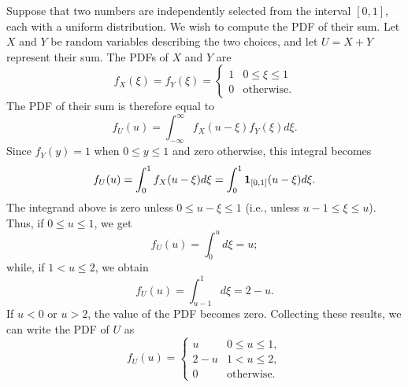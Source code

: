 \begin{example}
Suppose that two numbers are independently selected from the interval $[0,1]$, each with a uniform distribution.
We wish to compute the PDF of their sum.
Let $X$ and $Y$ be random variables describing the two choices, and let $U = X + Y$ represent their sum.
The PDFs of $X$ and $Y$ are
\begin{equation*}
f_X(\xi) = f_Y(\xi)
= \begin{cases} 1 & 0 \leq \xi \leq 1 \\
0 & \text{otherwise} . \end{cases}
\end{equation*}
The PDF of their sum is therefore equal to
\begin{equation*}
f_U(u) = \int_{-\infty}^{\infty} f_X(u - \xi) f_Y(\xi) d\xi .
\end{equation*}
Since $f_Y(y) = 1$ when $0 \leq y \leq 1$ and zero otherwise, this integral becomes
\begin{equation*}
f_U (u) = \int_0^1 f_X(u - \xi) d\xi
= \int_0^1 \mathbf{1}_{[0,1]}(u - \xi) d\xi .
\end{equation*}
The integrand above is zero unless $0 \leq u - \xi \leq 1$ (i.e., unless $u - 1 \leq \xi \leq u$).
Thus, if $0 \leq u \leq 1$, we get
\begin{equation*}
f_U(u) = \int_0^u d\xi = u ;
\end{equation*}
while, if $1 < u \leq 2$, we obtain
\begin{equation*}
f_U(u) = \int_{u - 1}^1 d\xi = 2 - u .
\end{equation*}
If $u < 0$ or $u > 2$, the value of the PDF becomes zero.
Collecting these results, we can write the PDF of $U$ as
\begin{equation*}
f_U(u) = \begin{cases} u & 0 \leq u \leq 1, \\
2-u & 1 < u \leq 2, \\
0 & \text{otherwise} . \end{cases}
\end{equation*}
\end{example}

